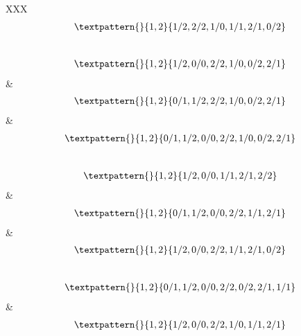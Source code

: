 \begin{center}
\begin{longtabu}[l]{XXX}
\begin{equation}
\begin{gathered}
		\textpattern{}{1,2}{1/2,2/2,1/0,1/1,2/1,0/2}
	\end{gathered}
	\label{cls:175}
\end{equation}
\\
\begin{equation}
	\begin{gathered}
		\textpattern{}{1,2}{1/2,0/0,2/2,1/0,0/2,2/1}
	\end{gathered}
	\label{cls:176}
\end{equation}
&
\begin{equation}
	\begin{gathered}
		\textpattern{}{1,2}{0/1,1/2,2/2,1/0,0/2,2/1}
	\end{gathered}
	\label{cls:177}
\end{equation}
&
\begin{equation}
	\begin{gathered}
		\textpattern{}{1,2}{0/1,1/2,0/0,2/2,1/0,0/2,2/1}
	\end{gathered}
	\label{cls:178}
\end{equation}
\\
\begin{equation}
	\begin{gathered}
		\textpattern{}{1,2}{1/2,0/0,1/1,2/1,2/2}
	\end{gathered}
	\label{cls:179}
\end{equation}
&
\begin{equation}
	\begin{gathered}
		\textpattern{}{1,2}{0/1,1/2,0/0,2/2,1/1,2/1}
	\end{gathered}
	\label{cls:180}
\end{equation}
&
\begin{equation}
	\begin{gathered}
		\textpattern{}{1,2}{1/2,0/0,2/2,1/1,2/1,0/2}
	\end{gathered}
	\label{cls:181}
\end{equation}
\\
\begin{equation}
	\begin{gathered}
		\textpattern{}{1,2}{0/1,1/2,0/0,2/2,0/2,2/1,1/1}
	\end{gathered}
	\label{cls:182}
\end{equation}
&
\begin{equation}
	\begin{gathered}
		\textpattern{}{1,2}{1/2,0/0,2/2,1/0,1/1,2/1}
	\end{gathered}
	\label{cls:183}
\end{equation}

\end{longtabu}
\end{center}
